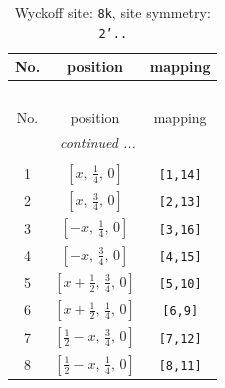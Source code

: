 \documentclass[fleqn,8pt]{jsarticle}
\begin{document}
\begin{longtable}{ccc}
\caption{Wyckoff site: {\tt 8k}, site symmetry: {\tt 2'..}}
 \\
 \hline \hline
No. & position & mapping \\ \hline \endfirsthead

\multicolumn{2}{l}{\tablename\ \thetable{}} \\
 \hline \hline
No. & position & mapping \\ \hline \endhead

 \hline \hline
\multicolumn{2}{r}{\footnotesize\it continued ...} \\ \endfoot

 \hline \hline
\multicolumn{2}{r}{} \\ \endlastfoot

1 & $\left[ x,\, \frac{1}{4},\, 0 \right]$ & {\tt [1,14]} \\ \hline
2 & $\left[ x,\, \frac{3}{4},\, 0 \right]$ & {\tt [2,13]} \\ \hline
3 & $\left[ - x,\, \frac{1}{4},\, 0 \right]$ & {\tt [3,16]} \\ \hline
4 & $\left[ - x,\, \frac{3}{4},\, 0 \right]$ & {\tt [4,15]} \\ \hline
5 & $\left[ x + \frac{1}{2},\, \frac{3}{4},\, 0 \right]$ & {\tt [5,10]} \\ \hline
6 & $\left[ x + \frac{1}{2},\, \frac{1}{4},\, 0 \right]$ & {\tt [6,9]} \\ \hline
7 & $\left[ \frac{1}{2} - x,\, \frac{3}{4},\, 0 \right]$ & {\tt [7,12]} \\ \hline
8 & $\left[ \frac{1}{2} - x,\, \frac{1}{4},\, 0 \right]$ & {\tt [8,11]} \\
\end{longtable}
\renewcommand{\arraystretch}{1.2}
\end{document}
